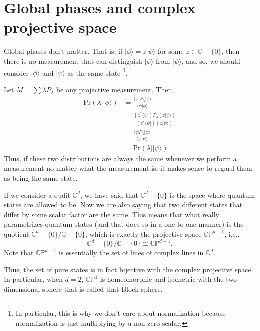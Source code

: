 \documentclass{article}
\newcommand{\ket}[1]{|#1\rangle}
\newcommand{\bra}[1]{\langle#1|}
\newcommand{\braket}[2]{\langle#1|#2\rangle}
\newcommand{\bbC}{\mathbb{C}}
\begin{document}
\section{Global phases and complex projective space}

Global phases don't matter. That is, if $\ket \phi = z \ket \psi$ for
some $z \in \mathbb C - \{ 0 \}$, then there is no measurement that can 
distinguish $\ket \phi$ from $\ket \psi$, and so, we should consider
$\ket \phi$ and $\ket \psi$ as the same state \footnote{In particular,
this is why we don't care about normalization because normalization is
just multiplying by a non-zero scalar.}.

Let $M = \sum \lambda P_{\lambda}$ be any projective measurement.
Then,
\begin{align*}
     \mathrm{Pr}(\lambda | \ket \phi) &= \frac{\braket{\phi | P_{\lambda}}{\phi}}
                                         {\braket{\phi}{\phi}} \\
                                      &= \frac{(z^* \bra \psi) P_{\lambda} (z \ket \psi)}
                                              {(z^* \bra \psi) (z \ket \psi)} \\
                                      &= \frac{\braket{\psi P_{\lambda}}{\psi}}
                                              {\braket{\psi}{\psi}} \\
                                      &= \mathrm{Pr}(\lambda | \ket \psi).
\end{align*}
Thus, if these two distributions are always the same whenever we perform a measurement
no matter what the measurement is, it makes sense to regard them as being the same 
state.

If we consider a qudit $\mathbb C^d$, we have said that $\mathbb C^d - \{ 0 \}$
is the space where quantum states are allowed to be. Now we are also saying
that two different states that differ by some scalar factor are the same.
This means that what really parametrizes quantum states (and that does so
in a one-to-one manner) is the quotient 
$\mathbb C^d - \{ 0 \} / \mathbb C - \{ 0 \}$, which is exactly
the projective space $\mathbb C \mathbb P^{d-1}$, i.e.,
$$ \mathbb C^d - \{ 0 \} / \mathbb C - \{ 0 \} \cong \mathbb C \mathbb P^{d-1}.$$
Note that $\bbC\mathbb{P}^{d-1}$ is essentially the 
set of lines of complex lines in $\mathbb C^d$.

Thus, the set of pure states is in fact bijective with the complex projective space.
In particular, when $d=2$, $\mathbb C \mathbb P^{1}$ is homeomorphic
and isometric with the two dimensional sphere that is called that 
Bloch sphere.
\end{document}
